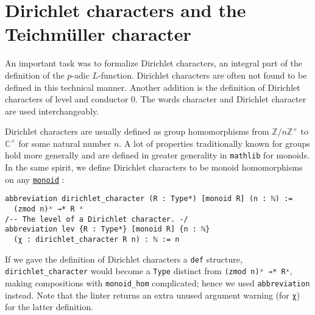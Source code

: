 \documentclass[a4paper,UKenglish,cleveref, autoref, thm-restate]{lipics-v2021}
\newcommand{\lean}[1]{\texttt{#1}\xspace} %
\begin{document}
\section{Dirichlet characters and the Teichmüller character}
\label{dirchar}
An important task was to formalize Dirichlet characters, an integral part of the definition of the $p$-adic $L$-function. 
Dirichlet characters are often not found to be defined in this technical manner. Another addition is the definition of 
Dirichlet characters of level and conductor 0. The words character and Dirichlet character are used interchangeably. 

Dirichlet characters are usually defined as group homomorphisms from $\mathbb{Z}/n \mathbb{Z}^{\times}$ to $\mathbb{C}^{\times}$ for some natural number $n$. 
A lot of properties traditionally known for groups hold more generally and are defined in greater generality in \lean{mathlib} for monoids. In the same spirit, 
we define Dirichlet characters to be monoid homomorphisms on any \href{https://leanprover-community.github.io/mathlib_docs/algebra/group/defs.html#monoid}{\lean{monoid}} :
\begin{lstlisting}
abbreviation dirichlet_character (R : Type*) [monoid R] (n : ℕ) := 
  (zmod n)ˣ →* R ˣ 
/-- The level of a Dirichlet character. -/
abbreviation lev {R : Type*} [monoid R] {n : ℕ} 
  (χ : dirichlet_character R n) : ℕ := n
\end{lstlisting}
If we gave the definition of Dirichlet characters a \lean{def} structure, 
\lean{dirichlet\_character} would become a \lean{Type} distinct from \lean{(zmod n)ˣ →* Rˣ}, 
making compositions with \lean{monoid\_hom} complicated; hence we used \lean{abbreviation} instead. 
Note that the linter returns an extra unused argument warning (for \lean{χ}) for the latter definition. 
\end{document}
